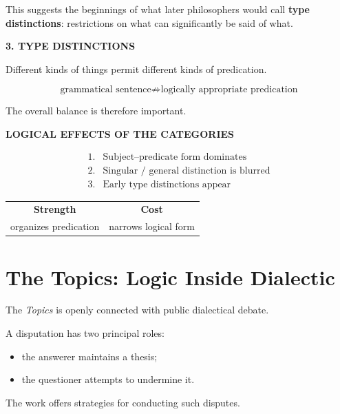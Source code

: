 \documentclass[11pt]{article}
\begin{document}
This suggests the beginnings of what later philosophers would
call \textbf{type distinctions}: restrictions on what can
significantly be said of what.

\begin{whiteboard}
\textbf{3. TYPE DISTINCTIONS}

Different kinds of things permit
different kinds of predication.

\[
\text{grammatical sentence}
\not\Rightarrow
\text{logically appropriate predication}
\]
\end{whiteboard}

The overall balance is therefore important.

\begin{whiteboard}
\textbf{LOGICAL EFFECTS OF THE CATEGORIES}

\[
\begin{array}{ll}
1. & \text{Subject--predicate form dominates}\\
2. & \text{Singular / general distinction is blurred}\\
3. & \text{Early type distinctions appear}
\end{array}
\]

\begin{center}
\begin{tabular}{c@{\qquad}c}
\textbf{Strength} & \textbf{Cost}\\
organizes predication & narrows logical form
\end{tabular}
\end{center}
\end{whiteboard}

\section{The Topics: Logic Inside Dialectic}

The \textit{Topics} is openly connected with public dialectical
debate.

A disputation has two principal roles:

\begin{itemize}
    \item the answerer maintains a thesis;
    \item the questioner attempts to undermine it.
\end{itemize}

The work offers strategies for conducting such disputes.
\end{document}
